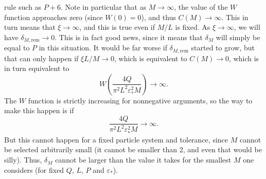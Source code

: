 \documentclass[a4paper,10pt]{article}
\begin{document}
rule such as $P+6$. Note in particular that as $M \to \infty$,
the value of the $W$ function approaches zero (since $W(0)=0$),
and thus $C(M) \to \infty$. This in turn means that $\xi \to
\infty$, and this is true even if $M/L$ is fixed. As $\xi \to
\infty$, we will have $\delta_{M,\text{rem}} \to 0$. This is in
fact good news, since it means that $\delta_M$ will simply be
equal to $P$ in this situation. It would be far worse if
$\delta_{M,\text{rem}}$ started to grow, but that can only happen
if $\xi L/M \to 0$, which is equivalent to $C(M) \to 0$, which is
in turn equivalent to
\[
  W\left(\frac{4Q}{\pi^2 L^2 \varepsilon_*^2 M}\right) \to \infty.
\]
The $W$ function is strictly increasing for nonnegative
arguments, so the way to make this happen is if
\[
  \frac{4Q}{\pi^2 L^2 \varepsilon_*^2 M} \to \infty.
\]
But this cannot happen for a fixed particle system and tolerance,
since $M$ cannot be selected arbitrarily small (it cannot be
smaller than 2, and even that would be silly). Thus, $\delta_M$
cannot be larger than the value it takes for the smallest $M$ one
considers (for fixed $Q$, $L$, $P$ and $\varepsilon_*$).
\end{document}

